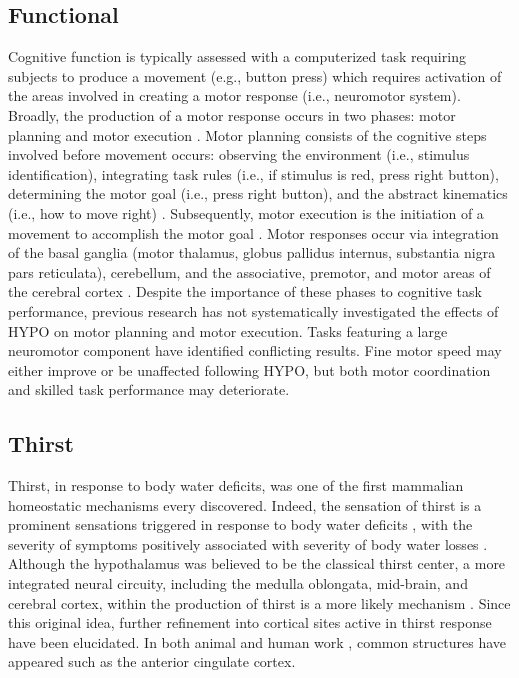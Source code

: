 \subsection{Functional}
 Cognitive function is typically assessed with a computerized task requiring subjects to produce a movement (e.g., button press) which requires activation of the areas involved in creating a motor response (i.e., neuromotor system). Broadly, the production of a motor response occurs in two phases: motor planning and motor execution \cite{crammond_prior_2000}. Motor planning consists of the cognitive steps involved before movement occurs: observing the environment (i.e., stimulus identification), integrating task rules (i.e., if stimulus is red, press right button), determining the motor goal (i.e., press right button), and the abstract kinematics (i.e., how to move right) \cite{wong_motor_2015}. Subsequently, motor execution is the initiation of a movement to accomplish the motor goal \cite{kaufman_roles_2013}. Motor responses occur via integration of the basal ganglia (motor thalamus, globus pallidus internus, substantia nigra pars reticulata), cerebellum, and the associative, premotor, and motor areas of the cerebral cortex \cite{rizzolatti_organization_1998,bosch-bouju_motor_2013}. Despite the importance of these phases to cognitive task performance, previous research has not systematically investigated the effects of HYPO on motor planning and motor execution. Tasks featuring a large neuromotor component have identified conflicting results. Fine motor speed may either improve \cite{bandelow_effects_2010} or be unaffected \cite{hogervorst_cognitive_1996} following HYPO, but both motor coordination \cite{sharma_influence_1986,cian_influence_2000} and skilled task performance \cite{baker_dehydration_2007, watson_mild_2015,lieberman_severe_2005} may deteriorate. 

\subsection{Thirst}
Thirst, in response to body water deficits, was one of the first mammalian homeostatic mechanisms every discovered. Indeed, the sensation of thirst is a prominent sensations triggered in response to body water deficits \cite{bourque_central_2008}, with the severity of symptoms positively associated with severity of body water losses \cite{engell_thirst_1987}. Although the hypothalamus was believed to be the classical thirst center, a more integrated neural circuity, including the medulla oblongata, mid-brain, and cerebral cortex, within the production of thirst is a more likely mechanism \cite{mckinley_water_2006}. Since this original idea, further refinement into cortical sites active in thirst response have been elucidated. In both animal \cite{robinson_alimentary_1968} and human work \cite{egan_neural_2003}, common structures have appeared such as the anterior cingulate cortex. 



